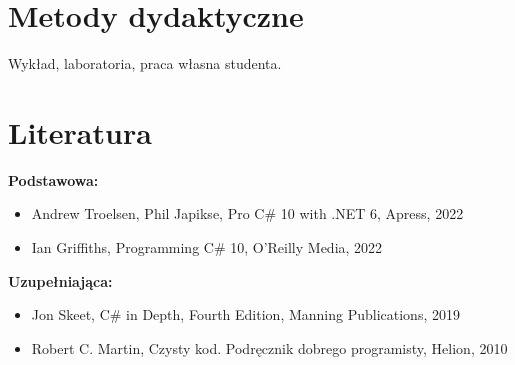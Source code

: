 \documentclass[12pt, a4paper]{article}
\begin{document}
\section{Metody dydaktyczne}

Wykład, laboratoria, praca własna studenta.

\section{Literatura}

\textbf{Podstawowa:}
\begin{itemize}
  \item Andrew Troelsen, Phil Japikse, Pro C\# 10 with .NET 6, Apress, 2022
  \item Ian Griffiths, Programming C\# 10, O'Reilly Media, 2022
\end{itemize}

\textbf{Uzupełniająca:}
\begin{itemize}
  \item Jon Skeet, C\# in Depth, Fourth Edition, Manning Publications, 2019
  \item Robert C. Martin, Czysty kod. Podręcznik dobrego programisty, Helion, 2010
\end{itemize}
\end{document}
